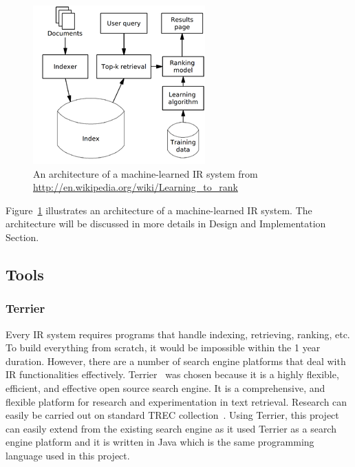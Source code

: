 \begin{figure}
\centering
\includegraphics[scale=0.7]{./figures/letor.png}
\caption{An architecture of a machine-learned IR system from \protect\url{http://en.wikipedia.org/wiki/Learning_to_rank}} \label{fig:letor} 
\end{figure}
Figure~\ref{fig:letor} illustrates an architecture of a machine-learned IR system. The architecture will be discussed in more details in Design and 
Implementation Section.

\subsection{Tools}

\subsubsection{Terrier}\label{section:terrier}
Every IR system requires programs that handle indexing, retrieving, ranking, etc. To build everything from scratch, it would be impossible within
the 1 year duration. However, there are a number of search engine platforms that deal with IR functionalities effectively.
Terrier~\cite{terrier} was chosen because it is a highly flexible, efficient, and effective open source search engine.
It is a comprehensive, and flexible platform for research and experimentation in text retrieval. Research can easily be 
carried out on standard TREC collection~\cite{trec}. 
Using Terrier, this project can easily extend from the existing search engine as it used Terrier as a search engine platform and it is written in Java
which is the same programming language used in this project.

